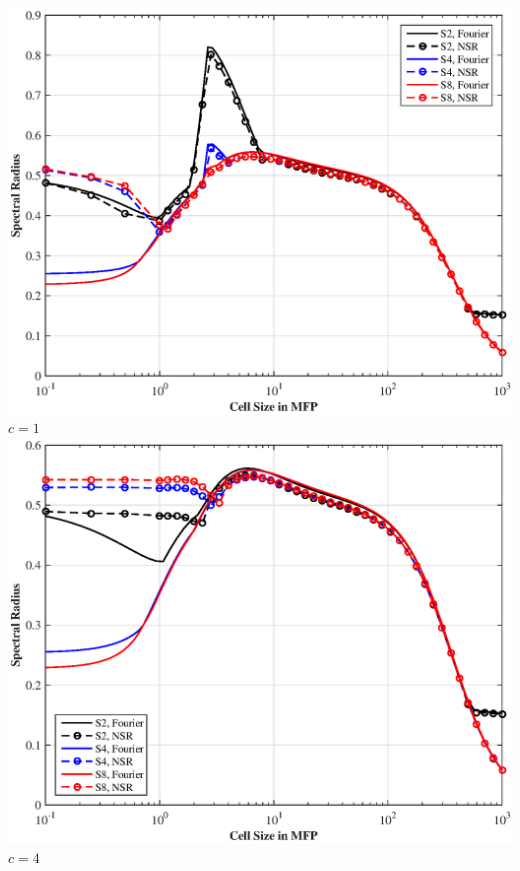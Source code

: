 \documentclass[compress,10pt]{beamer}
\begin{document}
\begin{frame}[t]
{\begin{columns}
\centering
\includegraphics[width=\textwidth]{images/SI_MIP_hex_C=1_PWLD_LS_wNSR.eps}\\
$c=1$
\centering
\includegraphics[width=\textwidth]{images/SI_MIP_hex_C=4_PWLD_LS_wNSR.eps}\\
$c=4$
\end{columns}
}
\end{frame}
\end{document}
